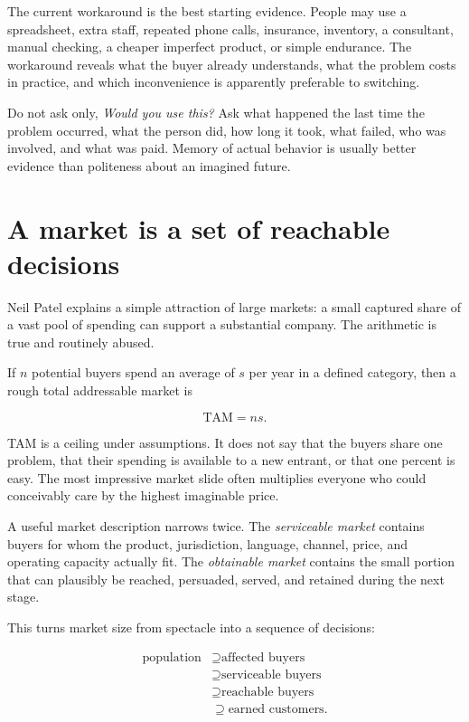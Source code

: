 The current workaround is the best starting evidence. People may use a
spreadsheet, extra staff, repeated phone calls, insurance, inventory, a
consultant, manual checking, a cheaper imperfect product, or simple endurance.
The workaround reveals what the buyer already understands, what the problem
costs in practice, and which inconvenience is apparently preferable to
switching.

Do not ask only, \emph{Would you use this?} Ask what happened the last time the
problem occurred, what the person did, how long it took, what failed, who was
involved, and what was paid. Memory of actual behavior is usually better
evidence than politeness about an imagined future.

\section{A market is a set of reachable decisions}

Neil Patel explains a simple attraction of large markets: a small captured
share of a vast pool of spending can support a substantial company. The
arithmetic is true and routinely abused.

If $n$ potential buyers spend an average of $s$ per year in a defined category,
then a rough total addressable market is

\begin{equation}
\mathrm{TAM} = n s.
\end{equation}

TAM is a ceiling under assumptions. It does not say that the buyers share one
problem, that their spending is available to a new entrant, or that one percent
is easy. The most impressive market slide often multiplies everyone who could
conceivably care by the highest imaginable price.

A useful market description narrows twice. The \emph{serviceable market}
contains buyers for whom the product, jurisdiction, language, channel, price,
and operating capacity actually fit. The \emph{obtainable market} contains the
small portion that can plausibly be reached, persuaded, served, and retained
during the next stage.

This turns market size from spectacle into a sequence of decisions:

\begin{equation}
\begin{aligned}
\text{population}&\supseteq \text{affected buyers}\\
&\supseteq \text{serviceable buyers}\\
&\supseteq \text{reachable buyers}\\
&\supseteq \text{earned customers}.
\end{aligned}
\end{equation}

